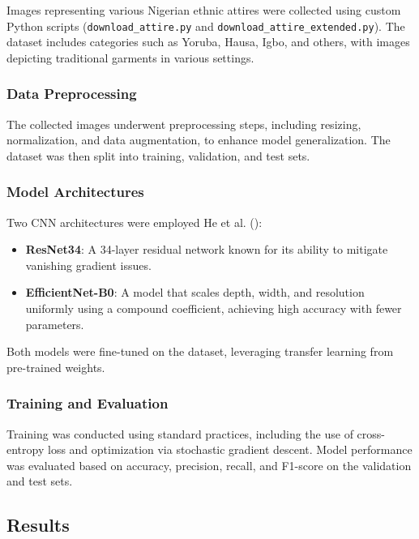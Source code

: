 \documentclass[
  letterpaper,
  DIV=11,
  numbers=noendperiod]{scrartcl}
\begin{document}
Images representing various Nigerian ethnic attires were collected using
custom Python scripts (\texttt{download\_attire.py} and
\texttt{download\_attire\_extended.py}). The dataset includes categories
such as Yoruba, Hausa, Igbo, and others, with images depicting
traditional garments in various settings.

\subsubsection{Data Preprocessing}\label{data-preprocessing}

The collected images underwent preprocessing steps, including resizing,
normalization, and data augmentation, to enhance model generalization.
The dataset was then split into training, validation, and test sets.

\subsubsection{Model Architectures}\label{model-architectures}

Two CNN architectures were employed He et al.
():

\begin{itemize}
\item
  \textbf{ResNet34}: A 34-layer residual network known for its ability
  to mitigate vanishing gradient issues.
\item
  \textbf{EfficientNet-B0}: A model that scales depth, width, and
  resolution uniformly using a compound coefficient, achieving high
  accuracy with fewer parameters.
\end{itemize}

Both models were fine-tuned on the dataset, leveraging transfer learning
from pre-trained weights.

\subsubsection{Training and Evaluation}\label{training-and-evaluation}

Training was conducted using standard practices, including the use of
cross-entropy loss and optimization via stochastic gradient descent.
Model performance was evaluated based on accuracy, precision, recall,
and F1-score on the validation and test sets.

\subsection{Results}\label{results}
\end{document}
